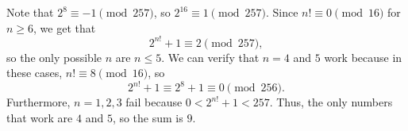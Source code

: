 Note that $2^8\equiv-1\pmod{257}$, so $2^{16}\equiv1\pmod{257}$. Since $n!\equiv0\pmod{16}$ for $n\geq6$, we get that \[2^{n!}+1\equiv2\pmod{257},\] so the only possible $n$ are $n\leq5$. We can verify that $n=4$ and $5$ work because in these cases, $n!\equiv8\pmod{16}$, so \[2^{n!}+1\equiv2^8+1\equiv0\pmod{256}.\] Furthermore, $n=1,2,3$ fail because $0<2^{n!}+1<257$. Thus, the only numbers that work are $4$ and $5$, so the sum is $\boxed{9}$.